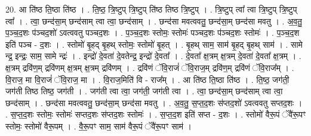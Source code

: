 \documentclass[17pt]{extarticle}
\begin{document}
20. आ ति॑ष्ठ ति॒ष्ठा ति॑ष्ठ । . ति॒ष्ठ॒ त्रि॒ष्टुप् त्रि॒ष्टुप् ति॑ष्ठ तिष्ठ त्रि॒ष्टुप् । . त्रि॒ष्टुप् त्वा᳚ त्वा त्रि॒ष्टुप् त्रि॒ष्टुप् त्वा᳚ । . त्वा॒ छन्द॑सा॒म् छन्द॑साम् त्वा त्वा॒ छन्द॑साम् । . छन्द॑सा मवत्ववतु॒ छन्द॑सा॒म् छन्द॑सा मवतु । . अ॒व॒तु॒ प॒ञ्च॒द॒शः प॑ञ्चद॒शो॑ ऽवत्ववतु पञ्चद॒शः । . प॒ञ्च॒द॒शः स्तोमः॒ स्तोमः॑ पञ्चद॒शः प॑ञ्चद॒शः स्तोमः॑ । . प॒ञ्च॒द॒श इति॑ पञ्च - द॒शः । . स्तोमो॑ बृ॒हद् बृ॒हथ् स्तोमः॒ स्तोमो॑ बृ॒हत् । . बृ॒हथ् साम॒ साम॑ बृ॒हद् बृ॒हथ् साम॑ । . सामे न्द्र॒ इन्द्रः॒ साम॒ सामे न्द्रः॑ । . इन्द्रो॑ दे॒वता॑ दे॒वतेन्द्र॒ इन्द्रो॑ दे॒वता᳚ । . दे॒वता᳚ क्ष॒त्रम् क्ष॒त्रम् दे॒वता॑ दे॒वता᳚ क्ष॒त्रम् । . क्ष॒त्रम् द्रवि॑ण॒म् द्रवि॑णम् क्ष॒त्रम् क्ष॒त्रम् द्रवि॑णम् । . द्रवि॑णं ॅवि॒राजं॑ ॅवि॒राज॒म् द्रवि॑ण॒म् द्रवि॑णं ॅवि॒राज᳚म् । . वि॒राज॒ मा वि॒राजं॑ ॅवि॒राज॒ मा । . वि॒राज॒मिति॑ वि - राज᳚म् । . आ ति॑ष्ठ ति॒ष्ठा ति॑ष्ठ । . ति॒ष्ठ॒ जग॑ती॒ जग॑ती तिष्ठ तिष्ठ॒ जग॑ती । . जग॑ती त्वा त्वा॒ जग॑ती॒ जग॑ती त्वा । . त्वा॒ छन्द॑सा॒म् छन्द॑साम् त्वा त्वा॒ छन्द॑साम् । . छन्द॑सा मवत्ववतु॒ छन्द॑सा॒म् छन्द॑सा मवतु । . अ॒व॒तु॒ स॒प्त॒द॒शः स॑प्तद॒शो॑ ऽवत्ववतु सप्तद॒शः । . स॒प्त॒द॒शः स्तोमः॒ स्तोमः॑ सप्तद॒शः स॑प्तद॒शः स्तोमः॑ । . स॒प्त॒द॒श इति॑ सप्त - द॒शः । . स्तोमो॑ वैरू॒पं ॅवै॑रू॒पꣳ स्तोमः॒ स्तोमो॑ वैरू॒पम् । . वै॒रू॒पꣳ साम॒ साम॑ वैरू॒पं ॅवै॑रू॒पꣳ साम॑ । \newline
\end{document}

